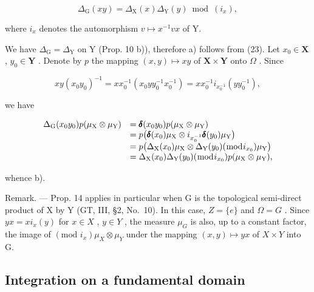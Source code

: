 \[
\Delta_ {\mathrm{G}} (x y) = \Delta_ {\mathrm{X}} (x) \Delta_ {\mathrm{Y}} (y) \bmod (i _ {x}),
\]

where \(i_x\) denotes the automorphism \(v \mapsto x^{-1}vx\) of Y.

We have \(\Delta_{\mathrm{G}} = \Delta_{\mathrm{Y}}\) on Y (Prop. 10 b)), therefore a) follows from (23). Let \(x_0 \in \mathbf{X}\) , \(y_0 \in \mathbf{Y}\) . Denote by \(p\) the mapping \((x, y) \mapsto xy\) of \(\mathbf{X} \times \mathbf{Y}\) onto \(\Omega\) . Since

\[
x y \left(x _ {0} y _ {0}\right) ^ {- 1} = x x _ {0} ^ {- 1} \left(x _ {0} y y _ {0} ^ {- 1} x _ {0} ^ {- 1}\right) = x x _ {0} ^ {- 1} i _ {x _ {0} ^ {- 1}} \left(y y _ {0} ^ {- 1}\right),
\]

we have

\[
\begin{array}{r l} \Delta_ {\mathrm{G}} (x _ {0} y _ {0}) p (\mu_ {\mathrm{X}} \otimes \mu_ {\mathrm{Y}}) & = \pmb {\delta} (x _ {0} y _ {0}) p (\mu_ {\mathrm{X}} \otimes \mu_ {\mathrm{Y}}) \\ & = p \big (\pmb {\delta} (x _ {0}) \mu_ {\mathrm{X}} \otimes i _ {x _ {0} ^ {- 1}} \pmb {\delta} (y _ {0}) \mu_ {\mathrm{Y}} \big) \\ & = p \big (\Delta_ {\mathrm{X}} (x _ {0}) \mu_ {\mathrm{X}} \otimes \Delta_ {\mathrm{Y}} (y _ {0}) (\bmod i _ {x _ {0}}) \mu_ {\mathrm{Y}} \big) \\ & = \Delta_ {\mathrm{X}} (x _ {0}) \Delta_ {\mathrm{Y}} (y _ {0}) (\bmod i _ {x _ {0}}) p (\mu_ {\mathrm{X}} \otimes \mu_ {\mathrm{Y}}), \end{array}
\]

whence b).

Remark. --- Prop. 14 applies in particular when G is the topological semi-direct product of X by Y (GT, III, §2, No.~10). In this case, \(Z = \{e\}\) and \(\Omega = G\) . Since \(yx = x i_{x}(y)\) for \(x \in X\) , \(y \in Y\) , the measure \(\mu_{G}\) is also, up to a constant factor, the image of \((\text{mod } i_{x})\mu_{X} \otimes \mu_{Y}\) under the mapping \((x, y) \mapsto yx\) of \(X \times Y\) into G.

\subsection{Integration on a fundamental domain}

